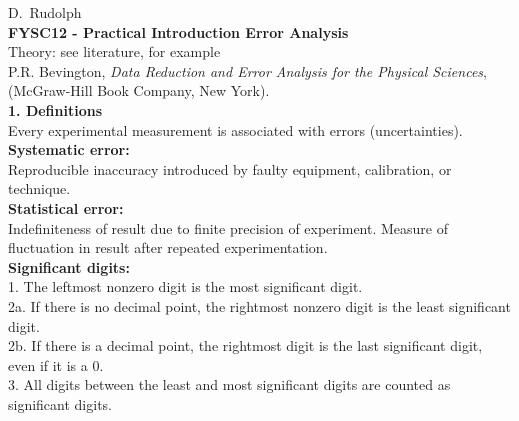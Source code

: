 \documentclass[12pt]{article}
\begin{document}
\renewcommand{\rmdefault}{phv}
\renewcommand{\sup}[1]{$^{\footnotesize\textsl{#1}}$}
\newcommand{\su}[1]{$^{\footnotesize\textrm{#1}}$}
\renewcommand{\sb}[1]{$_{\footnotesize\textrm{#1}}$}
\newcommand{\sss}[2]{$^{\footnotesize\textsl{#1}}_{\footnotesize\textsl{#2}}$}
\newcommand{\susu}[2]{$^{\footnotesize\textrm{#1}}_{\footnotesize\textrm{#2}}$}
\newcommand{\WB}{{\bf WB}\\}

\normalsize\vspace*{-1cm}

D.~Rudolph\\

{\Large\bf FYSC12 - Practical Introduction Error Analysis}\\
Theory: see literature, for example\\
{\small P.R. Bevington, {\it Data Reduction and Error Analysis
for the Physical Sciences},\\ (McGraw-Hill Book Company, New York).}\\

{\large\bf 1. Definitions}\\
Every experimental measurement is associated with errors (uncertainties).\\
{\bf Systematic error:}\\
Reproducible inaccuracy introduced by faulty
equipment, calibration, or technique.\\ %
{\bf Statistical error:}\\
Indefiniteness of result due to finite precision
of experiment. Measure of fluctuation in result after repeated
experimentation.\\ %
{\bf Significant digits:}\\
\hspace*{1em}1. The leftmost nonzero digit is the most significant digit.\\
\hspace*{1em}2a. If there is no decimal point, the rightmost nonzero digit
is the least significant \hspace*{2em}digit.\\
\hspace*{1em}2b. If there is a decimal point, the rightmost digit
is the last significant digit,\\ \hspace*{2em}even if it is a 0.\\
\hspace*{1em}3. All digits between the least and most significant digits
are counted as significant \hspace*{2em}digits.\\
\end{document}
